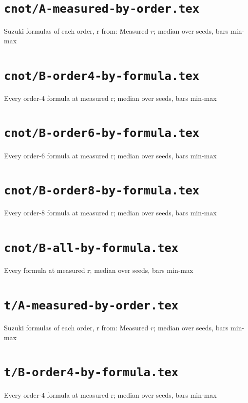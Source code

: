 \documentclass{article}
\begin{document}
\section*{\texttt{cnot/A-measured-by-order.tex}}
Suzuki formulas of each order, r from: Measured $r$; median over seeds, bars min-max\par\medskip

\clearpage

\section*{\texttt{cnot/B-order4-by-formula.tex}}
Every order-4 formula at measured r; median over seeds, bars min-max\par\medskip

\clearpage

\section*{\texttt{cnot/B-order6-by-formula.tex}}
Every order-6 formula at measured r; median over seeds, bars min-max\par\medskip

\clearpage

\section*{\texttt{cnot/B-order8-by-formula.tex}}
Every order-8 formula at measured r; median over seeds, bars min-max\par\medskip

\clearpage

\section*{\texttt{cnot/B-all-by-formula.tex}}
Every formula at measured r; median over seeds, bars min-max\par\medskip

\clearpage

\section*{\texttt{t/A-measured-by-order.tex}}
Suzuki formulas of each order, r from: Measured $r$; median over seeds, bars min-max\par\medskip

\clearpage

\section*{\texttt{t/B-order4-by-formula.tex}}
Every order-4 formula at measured r; median over seeds, bars min-max\par\medskip

\clearpage
\end{document}

